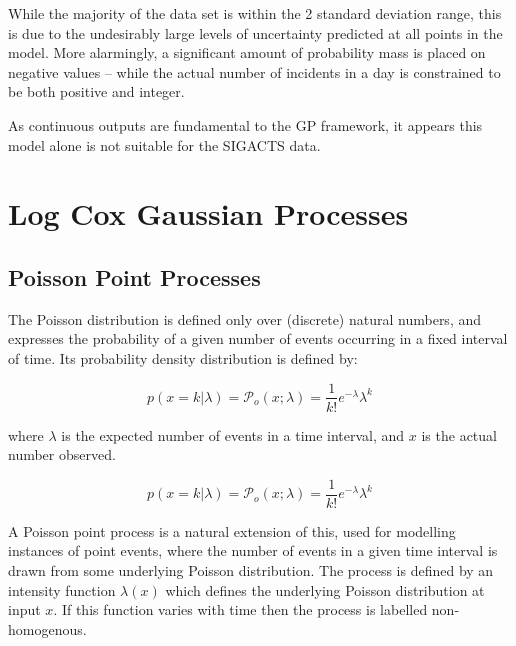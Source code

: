 \documentclass[a4paper,11pt]{report}
\begin{document}
While the majority of the data set is within the 2 standard deviation range, this is due to the undesirably large levels of uncertainty predicted at all points in the model. More alarmingly, a significant amount of probability mass is placed on negative values -- while the actual number of incidents in a day is constrained to be both positive and integer. \par 

As continuous outputs are fundamental to the GP framework, it appears this model alone is not suitable for the SIGACTS data. 


\chapter{Log Cox Gaussian Processes}

\section{Poisson Point Processes}
The Poisson distribution is defined only over (discrete) natural numbers, and expresses the probability of a given number of events occurring in a fixed interval of time. Its probability density distribution is defined by:

\begin{equation}\label{eq:poisson}
p(x=k|\lambda) = \mathcal{P}_o (x;\lambda) = \frac{1}{k!} e^{-\lambda} \lambda^k
\end{equation}

where \(\lambda\) is the expected number of events in a time interval, and \(x\) is the actual number observed. \cite{Barber}

\begin{equation}\label{eq:poisson}
 p(x=k|\lambda) = \mathcal{P}_o (x;\lambda) = \frac{1}{k!} e^{-\lambda} \lambda^k
\end{equation}

A Poisson point process is a natural extension of this, used for modelling instances of point events, where the number of events in a given time interval is drawn from some underlying Poisson distribution. The process is defined by an intensity function \(\lambda(x)\) which defines the underlying Poisson distribution at input \(x\). If this function varies with time then the process is labelled non-homogenous.\cite{Gregory} 
\end{document}
